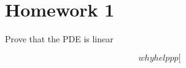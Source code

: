 \section*{Homework 1}
\begin{problem}
    Prove that the PDE is linear
\end{problem}
\begin{solution}
   \[
why helppp[
   \]
\end{solution}

